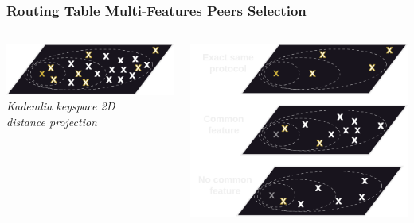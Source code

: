 \documentclass{../pl-slide}
\begin{document}
\begin{frame}
\frametitle{Routing Table Multi-Features Peers Selection}
\begin{columns}[onlytextwidth]
	\begin{column}{0.49\textwidth}
	    		\begin{center}
        		\includegraphics[scale=.35]{resources/1-plan-rt.png}\\
        		\medskip
        		\textit{Kademlia keyspace 2D\\distance projection}
        		\end{center}
	\end{column}
	\begin{column}{0.49\textwidth}
    		\begin{center}
        		\includegraphics[scale=.26]{resources/dimensions-rt.png}
    		\end{center}
	\end{column}

\end{columns}
\end{frame}
\end{document}
